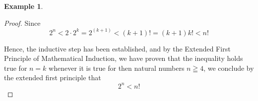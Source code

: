 \documentclass{book}
\theoremstyle{definition}
\newtheorem{example}{Example}[definition]
\theoremstyle{remark}
\newcommand{\m}{\cdot}
\begin{document}
\begin{example}
\begin{proof}
           Since
                \begin{equation}
                    2^n < 2 \m 2^k = 2^(k+1) < (k+1)! = (k+1)k! < n! 
                \end{equation}
            
        Hence, the inductive step has been established, and by the Extended First Principle of Mathematical Induction, we have proven that the inequality holds true for $n=k$ whenever it is true for then natural numbers $n \geqq 4$, we conclude by the extended first principle that
            \begin{equation*}
                2^n < n!
            \end{equation*}
    \end{proof}
\end{example}
\end{document}
